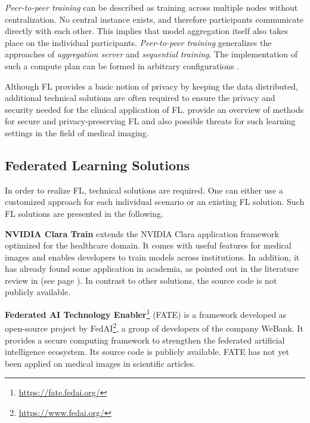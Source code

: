 \textit{Peer-to-peer training} can be described as training across multiple nodes without centralization. No central instance exists, and therefore participants communicate directly with each other. This implies that model aggregation itself also takes place on the individual participants.
\textit{Peer-to-peer training} generalizes the approaches of \textit{aggregation server} and \textit{sequential training}. The implementation of such a compute plan can be formed in arbitrary configurations \citep{Chang2018DistributedImaging, Lalitha2019Peer-to-peerGraphs, Roy2019BrainTorrent:Learning}.

Although FL provides a basic notion of privacy by keeping the data distributed, additional technical solutions are often required to ensure the privacy and security needed for the clinical application of FL. \cite{Kaissis2020SecureImaging} provide an overview of methods for secure and privacy-preserving FL and also possible threats for such learning settings in the field of medical imaging.



\subsection{Federated Learning Solutions}
\label{subsec:SolutionsFL}

In order to realize FL, technical solutions are required. One can either use a customized approach for each individual scenario or an existing FL solution. Such FL solutions are presented in the following. %

\textbf{NVIDIA Clara Train}
extends the NVIDIA Clara application framework optimized for the healthcare domain. It comes with useful features for medical images and enables developers to train models across institutions. In addition, it has already found some application in academia, as pointed out in the literature review in  (see page \pageref{subsec:LitRev}). In contrast to other solutions, the source code is not publicly available.

\textbf{Federated AI Technology Enabler}\footnote{\url{https://fate.fedai.org/}}
(FATE) is a framework developed as open-source project by FedAI\footnote{\url{https://www.fedai.org/}}, a group of developers of the company WeBank. It provides a secure computing framework to strengthen the federated artificial intelligence ecosystem. Its source code is publicly available.
FATE has not yet been applied on medical images in scientific articles.

